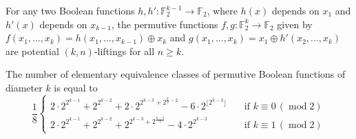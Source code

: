 \documentclass[10pt,a4paper]{amsart}
\newcommand{\F}{\mathbb{F}}
\begin{document}
	\begin{proposition}\label{permutive}
		For any two Boolean functions $h, h'\colon\F_2^{k-1} \to \F_2$, where $h(x)$ depends on $x_1$ and $h'(x)$ depends on $x_{k-1}$, the permutive functions $f, g\colon\F_2^k \to \F_2$ given by $f(x_1, \dotsc, x_k) = h(x_1, \dotsc, x_{k-1}) \oplus x_k$ and $g(x_1, \dotsc, x_k) = x_1 \oplus h'(x_2, \dotsc, x_k)$ are potential $(k, n)$-liftings for all $n \geq k$.
	\end{proposition}

    \begin{corollary}\label{permutive-bound}
    The number of elementary equivalence classes of permutive Boolean functions of diameter $k$ is equal to
    \[
    \frac{1}{8}
    \begin{cases}
        2 \cdot 2^{2^{k-1}} + 2^{2^{k-2}} + 2 \cdot 2^{2^{k-3} + 2^{\frac{k}{2}-2}} - 6 \cdot 2^{\lfloor 2^{k-3} \rfloor} &\quad\text{if }k \equiv 0\, (\operatorname{mod} 2)\\
        2 \cdot 2^{2^{k-1}} + 2^{2^{k-2}} + 2^{2^{k-3} + 2^{\frac{k-3}{2}}} - 4 \cdot 2^{2^{k-3}} &\quad\text{if }k \equiv 1\, (\operatorname{mod} 2)
    \end{cases}
    \]
    \end{corollary}
\end{document}
